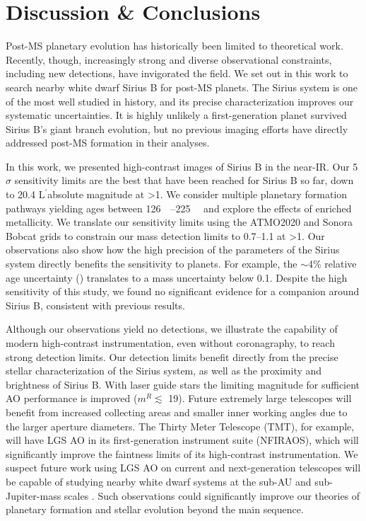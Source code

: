 \documentclass[twocolumn]{aastex631}
\newcommand\Lp{$\mathrm{L}^\prime$}
\begin{document}
\section{Discussion \& Conclusions}\label{sec:conclusion}

Post-MS planetary evolution has historically been limited to theoretical work. Recently, though, increasingly strong and diverse observational constraints, including new detections, have invigorated the field. We set out in this work to search nearby white dwarf Sirius B for post-MS planets. The Sirius system is one of the most well studied in history, and its precise characterization improves our systematic uncertainties. It is highly unlikely a first-generation planet survived Sirius B's giant branch evolution, but no previous imaging efforts have directly addressed post-MS formation in their analyses.

In this work, we presented high-contrast images of Sirius B in the near-IR. Our 5$\sigma$ sensitivity limits are the best that have been reached for Sirius B so far, down to \num{20.4} \Lp absolute magnitude at \textgreater\qty{1}{\au}. We consider multiple planetary formation pathways yielding ages between \qtyrange{126}{225}{\mega\year} and explore the effects of enriched metallicity. We translate our sensitivity limits using the ATMO2020 and Sonora Bobcat grids to constrain our mass detection limits to \qtyrange{0.7}{1.1}{\jupitermass} at \textgreater\qty{1}{\au}. Our observations also show how the high precision of the parameters of the Sirius system directly benefits the sensitivity to planets. For example, the $\sim$4\% relative age uncertainty () translates to a mass uncertainty below \qty{0.1}{\jupitermass}. Despite the high sensitivity of this study, we found no significant evidence for a companion around Sirius B, consistent with previous results.

Although our observations yield no detections, we illustrate the capability of modern high-contrast instrumentation, even without coronagraphy, to reach strong detection limits. Our detection limits benefit directly from the precise stellar characterization of the Sirius system, as well as the proximity and brightness of Sirius B. With laser guide stars \citep[LGS; e.g.,][]{vandamKeckObservatoryLaser2006,baranecRoboAO2FacilityRapid2018} the limiting magnitude for sufficient AO performance is improved ($m^R\lesssim$ \num{19}). Future extremely large telescopes will benefit from increased collecting areas and smaller inner working angles due to the larger aperture diameters. The Thirty Meter Telescope (TMT), for example, will have LGS AO in its first-generation instrument suite (NFIRAOS), which will significantly improve the faintness limits of its high-contrast instrumentation. We suspect future work using LGS AO on current and next-generation telescopes will be capable of studying nearby white dwarf systems at the sub-AU and sub-Jupiter-mass scales \citep{holberg25ParsecLocal2016}. Such observations could significantly improve our theories of planetary formation and stellar evolution beyond the main sequence.
\end{document}
